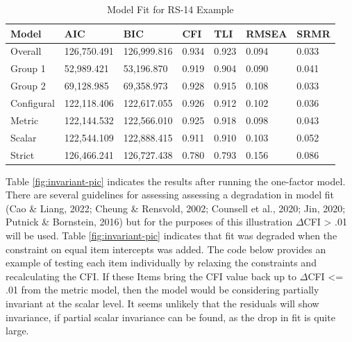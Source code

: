 \documentclass[
  man]{apa7}
\begin{document}
\begin{table}[tbp]

\begin{center}
\begin{threeparttable}

\caption{\label{tab:rs-table}Model Fit for RS-14 Example}

\begin{tabular}{lllllll}
\toprule
Model & AIC & BIC & CFI & TLI & RMSEA & SRMR\\
\midrule
Overall & 126,750.491 & 126,999.816 & 0.934 & 0.923 & 0.094 & 0.033\\
Group 1 & 52,989.421 & 53,196.870 & 0.919 & 0.904 & 0.090 & 0.041\\
Group 2 & 69,128.985 & 69,358.973 & 0.928 & 0.915 & 0.108 & 0.033\\
Configural & 122,118.406 & 122,617.055 & 0.926 & 0.912 & 0.102 & 0.036\\
Metric & 122,144.532 & 122,566.010 & 0.925 & 0.918 & 0.098 & 0.043\\
Scalar & 122,544.109 & 122,888.415 & 0.911 & 0.910 & 0.103 & 0.052\\
Strict & 126,466.241 & 126,727.438 & 0.780 & 0.793 & 0.156 & 0.086\\
\bottomrule
\end{tabular}

\end{threeparttable}
\end{center}

\end{table}

Table \ref{fig:invariant-pic} indicates the results after running the one-factor model. There are several guidelines for assessing assessing a degradation in model fit (Cao \& Liang, 2022; Cheung \& Rensvold, 2002; Counsell et al., 2020; Jin, 2020; Putnick \& Bornstein, 2016) but for the purposes of this illustration \(\Delta\)CFI \textgreater{} .01 will be used. Table \ref{fig:invariant-pic} indicates that fit was degraded when the constraint on equal item intercepts was added. The code below provides an example of testing each item individually by relaxing the constraints and recalculating the CFI. If these Items bring the CFI value back up to \(\Delta\)CFI \textless= .01 from the metric model, then the model would be considering partially invariant at the scalar level. It seems unlikely that the residuals will show invariance, if partial scalar invariance can be found, as the drop in fit is quite large.
\end{document}
